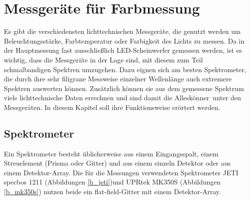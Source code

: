 \chapter{Messgeräte für Farbmessung}
Es gibt die verschiedensten lichttechnischen Messgeräte, die genutzt werden um Beleuchtungsstärke, Farbtemperatur oder Farbigkeit des Lichts zu messen. Da in der Hauptmessung fast ausschließlich LED-Scheinwerfer gemessen werden, ist es wichtig, dass die Messgeräte in der Lage sind, mit diesem zum Teil schmalbandigen Spektren umzugehen. Dazu eignen sich am besten Spektrometer, die durch ihre sehr filigrane Messweise einzelner Wellenlänge auch extremere Spektren auswerten können. Zusätzlich können sie aus dem gemessene Spektrum viele lichttechnische Daten errechnen und sind damit die \glqq Alleskönner\grqq\ unter den Messgeräten. In diesem Kapitel soll ihre Funktionsweise erörtert werden.
 
\section{Spektrometer}
Ein Spektrometer besteht üblicherweise aus einem Eingangsspalt, einem Streuelement (Prisma oder Gitter) und aus einem einzeln Detektor oder aus einem Detektor-Array. Die für die Messungen verwendeten Spektrometer JETI specbos 1211 (Abbildungen \ref{b_jeti})und UPRtek MK350S (Abbildungen \ref{b_mk350s}) nutzen beide ein flat-field-Gitter mit einem Detektor-Array.

